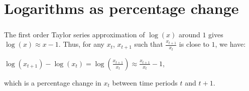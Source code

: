 \chapter{Logarithms as percentage change}
\label{appb}

\paragraph*{}The first order Taylor series approximation of $\log(x)$ around $1$ gives $\log(x) \approx x - 1$. Thus, for any $x_t$, $x_{t+1}$ such that $\frac{x_{t+1}}{x_t}$ is close to $1$, we have:

\begin{center}
	$\log(x_{t+1}) - \log(x_t) = \log(\frac{x_{t+1}}{x_t}) \approx \frac{x_{t+1}}{x_t} - 1$,
\end{center}

which is a percentage change in $x_t$ between time periods $t$ and $t+1$.
